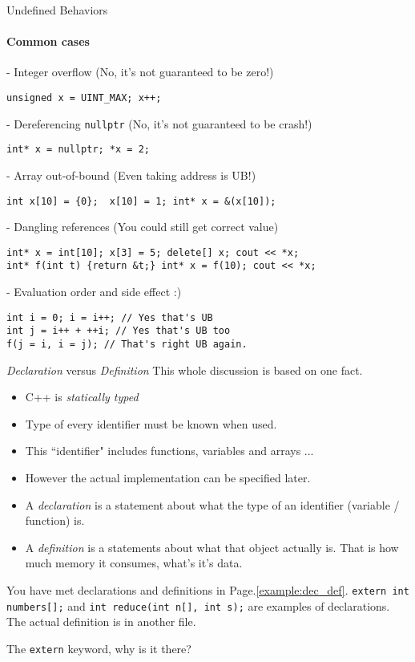 \begin{frame}[fragile]{Undefined Behaviors}
\framesubtitle{Common cases}


- Integer overflow (No, it's not guaranteed to be zero!)
\begin{verbatim}
unsigned x = UINT_MAX; x++;
\end{verbatim}

- Dereferencing \texttt{nullptr} (No, it's not guaranteed to be crash!)
\begin{verbatim}
int* x = nullptr; *x = 2;
\end{verbatim}

- Array out-of-bound (Even taking address is UB!)
\begin{verbatim}
int x[10] = {0};  x[10] = 1; int* x = &(x[10]);
\end{verbatim}



- Dangling references (You could still get correct value)
\begin{verbatim}
int* x = int[10]; x[3] = 5; delete[] x; cout << *x; 
int* f(int t) {return &t;} int* x = f(10); cout << *x;
\end{verbatim}

- Evaluation order and side effect :)
\begin{verbatim}
int i = 0; i = i++; // Yes that's UB
int j = i++ + ++i; // Yes that's UB too
f(j = i, i = j); // That's right UB again.
\end{verbatim}

\end{frame}

\begin{frame}{\textit{Declaration} versus \textit{Definition}}
	This whole discussion is based on one fact. 
	\begin{itemize}
		\item C++ is \textit{statically typed}
		\item Type of every identifier must be known when used.
		\item This ``identifier" includes functions, variables and arrays ...
		\item However the actual implementation can be specified later.
		\item A \textit{declaration} is a statement about what the type of an identifier (variable / function) is. 
		\item A \textit{definition} is a statements about what that object actually is. That is how much memory it consumes, what's it's data.
	\end{itemize}
	
	You have met declarations and definitions in Page.\ref{example:dec_def}.
	\texttt{extern int numbers[];} and \texttt{int reduce(int n[], int s);} are examples of declarations. The actual definition is in another file.
	
	The \texttt{extern} keyword, why is it there? 
\end{frame}

